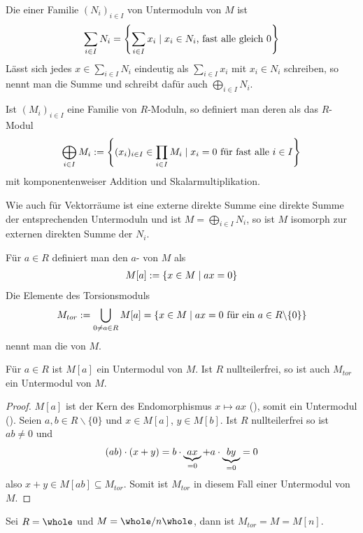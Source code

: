 \begin{definition}
	Die  einer Familie $(N_i)_{i\in I}$ von Untermoduln von $M$ ist
	\begin{align}
		\sum_{i\in I} N_i=\left\lbrace \sum_{i\in I} x_i\mid x_i\in N_i\text{, fast alle gleich 0}\right\rbrace \notag
	\end{align}
	Lässt sich jedes $x\in\sum_{i\in I} N_i$ eindeutig als $\sum_{i\in I} x_i$ mit $x_i\in N_i$ schreiben, so nennt man die Summe  und schreibt dafür auch $\bigoplus_{i\in I} N_i$.
	
	Ist $(M_i)_{i\in I}$ eine Familie von $R$-Moduln, so definiert man deren  als das $R$-Modul 
	\begin{align}
		\bigoplus_{i\in I} M_i := \left\lbrace (x_i)_{i\in I}\in \prod_{i\in I} M_i\mid x_i=0\text{ für fast alle } i\in I\right\rbrace \notag
	\end{align}
	mit komponentenweiser Addition und Skalarmultiplikation.
\end{definition}

\begin{remark}
	Wie auch für Vektorräume ist eine externe direkte Summe eine direkte Summe der entsprechenden Untermoduln und ist $M=\bigoplus_{i\in I} N_i$, so ist $M$ isomorph zur externen direkten Summe der $N_i$.
\end{remark}

\begin{definition}[Torsionsmodul]
	Für $a\in R$ definiert man den $a$- von $M$ als
	\begin{align}
		M[a]:=\{x\in M\mid ax=0\}\notag
	\end{align}
	Die Elemente des Torsionsmoduls
	\begin{align}
		M_{tor}:=\bigcup_{0\neq a\in R} M[a]=\{x\in M\mid ax=0\text{ für ein } a\in R\backslash\{0\}\}\notag
	\end{align}
	nennt man die  von $M$.
\end{definition}

\begin{proposition}
	Für $a\in R$ ist $M[a]$ ein Untermodul von $M$. Ist $R$ nullteilerfrei, so ist auch $M_{tor}$ ein Untermodul von $M$.
\end{proposition}
\begin{proof}
	$M[a]$ ist der Kern des Endomorphismus $x\mapsto ax$ (), somit ein Untermodul ().  Seien $a,b\in R\backslash\{0\}$ und $x\in M[a]$, $y\in M[b]$. Ist $R$ nullteilerfrei so ist $ab\neq 0$ und 
	\begin{align}
		(ab)\cdot (x+y)=b\cdot \underbrace{ax}_{=0} + a\cdot \underbrace{by}_{=0}=0\notag
	\end{align}
	also $x+y\in M[ab]\subseteq M_{tor}$. Somit ist $M_{tor}$ in diesem Fall einer Untermodul von $M$.
\end{proof}

\begin{example}
	Sei $R=\whole$ und $M=\whole/n\whole$, dann ist $M_{tor}=M=M[n]$.
\end{example}